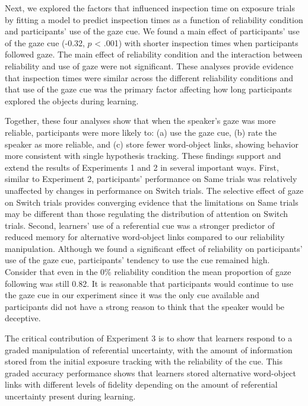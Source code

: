 \documentclass[oneside]{report}
\begin{document}
Next, we explored the factors that influenced inspection time on
exposure trials by fitting a model to predict inspection times as a
function of reliability condition and participants' use of the gaze cue.
We found a main effect of participants' use of the gaze cue (-0.32,
\(p\) \textless{} .001) with shorter inspection times when participants
followed gaze. The main effect of reliability condition and the
interaction between reliability and use of gaze were not significant.
These analyses provide evidence that inspection times were similar
across the different reliability conditions and that use of the gaze cue
was the primary factor affecting how long participants explored the
objects during learning.

Together, these four analyses show that when the speaker's gaze was more
reliable, participants were more likely to: (a) use the gaze cue, (b)
rate the speaker as more reliable, and (c) store fewer word-object
links, showing behavior more consistent with single hypothesis tracking.
These findings support and extend the results of Experiments 1 and 2 in
several important ways. First, similar to Experiment 2, participants'
performance on Same trials was relatively unaffected by changes in
performance on Switch trials. The selective effect of gaze on Switch
trials provides converging evidence that the limitations on Same trials
may be different than those regulating the distribution of attention on
Switch trials. Second, learners' use of a referential cue was a stronger
predictor of reduced memory for alternative word-object links compared
to our reliability manipulation. Although we found a significant effect
of reliability on participants' use of the gaze cue, participants'
tendency to use the cue remained high. Consider that even in the 0\%
reliability condition the mean proportion of gaze following was still
0.82. It is reasonable that participants would continue to use the gaze
cue in our experiment since it was the only cue available and
participants did not have a strong reason to think that the speaker
would be deceptive.

The critical contribution of Experiment 3 is to show that learners
respond to a graded manipulation of referential uncertainty, with the
amount of information stored from the initial exposure tracking with the
reliability of the cue. This graded accuracy performance shows that
learners stored alternative word-object links with different levels of
fidelity depending on the amount of referential uncertainty present
during learning.
\end{document}
